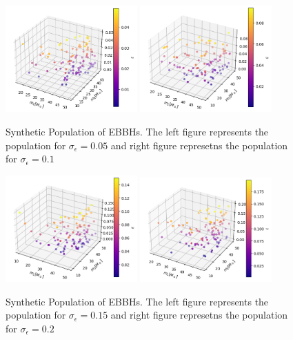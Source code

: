 \documentclass[twocolumn,prd,nofootinbib]{revtex4}
\begin{document}
\begin{figure}

\includegraphics[width=0.45\textwidth]{paper/figures/pop3d0.05.png}
\includegraphics[width=0.45\textwidth]{paper/figures/pop3d0.1.png}
\caption{\label{fig:pop3d0.05_0.1} Synthetic Population of EBBHs. The left figure represents the population for $\sigma_\epsilon=0.05$ and right figure represetns the population for $\sigma_\epsilon=0.1$}

\end{figure}



\begin{figure}

\includegraphics[width=0.45\textwidth]{paper/figures/pop3d0.15.png}
\includegraphics[width=0.45\textwidth]{paper/figures/pop3d0.2.png}
\caption{\label{fig:pop3d0.15_0.2} Synthetic Population of EBBHs. The left figure represents the population for $\sigma_\epsilon=0.15$ and right figure represetns the population for $\sigma_\epsilon=0.2$}

\end{figure}
\end{document}

